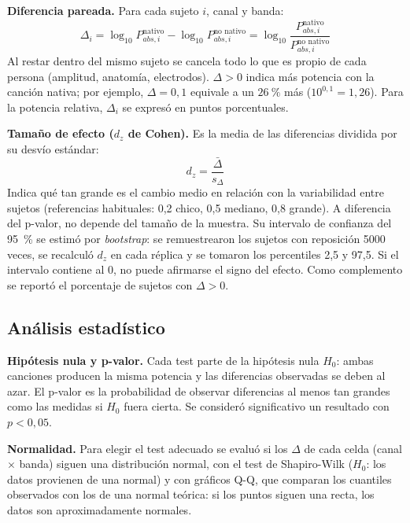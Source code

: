 \documentclass[11pt,a4paper]{article}
\begin{document}
\textbf{Diferencia pareada.} Para cada sujeto $i$, canal y banda:
\begin{equation}
  \Delta_i = \log_{10} P^{\text{nativo}}_{abs,i} - \log_{10} P^{\text{no nativo}}_{abs,i} = \log_{10}\frac{P^{\text{nativo}}_{abs,i}}{P^{\text{no nativo}}_{abs,i}}
\end{equation}
Al restar dentro del mismo sujeto se cancela todo lo que es propio de cada persona (amplitud, anatomía, electrodos). $\Delta > 0$ indica más potencia con la canción nativa; por ejemplo, $\Delta = 0{,}1$ equivale a un $26~\%$ más ($10^{0{,}1} = 1{,}26$). Para la potencia relativa, $\Delta_i$ se expresó en puntos porcentuales.

\textbf{Tamaño de efecto ($d_z$ de Cohen).} Es la media de las diferencias dividida por su desvío estándar:
\begin{equation}
  d_z = \frac{\bar{\Delta}}{s_\Delta}
\end{equation}
Indica qué tan grande es el cambio medio en relación con la variabilidad entre sujetos (referencias habituales: 0,2 chico, 0,5 mediano, 0,8 grande). A diferencia del p-valor, no depende del tamaño de la muestra. Su intervalo de confianza del 95~\% se estimó por \textit{bootstrap}: se remuestrearon los sujetos con reposición 5000 veces, se recalculó $d_z$ en cada réplica y se tomaron los percentiles 2,5 y 97,5. Si el intervalo contiene al 0, no puede afirmarse el signo del efecto. Como complemento se reportó el porcentaje de sujetos con $\Delta > 0$.

\subsection{Análisis estadístico}
\label{sec:estadistica}

\textbf{Hipótesis nula y p-valor.} Cada test parte de la hipótesis nula $H_0$: ambas canciones producen la misma potencia y las diferencias observadas se deben al azar. El p-valor es la probabilidad de observar diferencias al menos tan grandes como las medidas si $H_0$ fuera cierta. Se consideró significativo un resultado con $p < 0{,}05$.

\textbf{Normalidad.} Para elegir el test adecuado se evaluó si los $\Delta$ de cada celda (canal $\times$ banda) siguen una distribución normal, con el test de Shapiro-Wilk ($H_0$: los datos provienen de una normal) y con gráficos Q-Q, que comparan los cuantiles observados con los de una normal teórica: si los puntos siguen una recta, los datos son aproximadamente normales.
\end{document}
